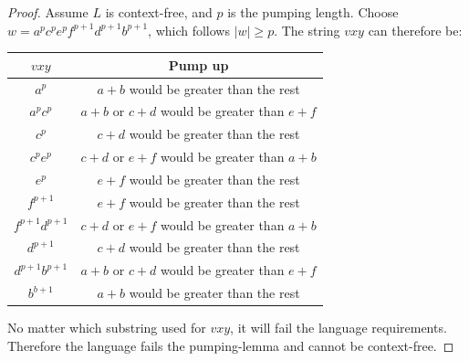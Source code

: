 \documentclass{article}
\begin{document}
\begin{enumerate}
            \begin{proof}
                Assume $L$ is context-free, and $p$ is the pumping length. Choose $w = a^pc^pe^pf^{p+1}d^{p+1}b^{p+1}$, which follows $|w| \geq p$. The string $vxy$ can therefore be:\\
                \begin{tabular}{|c|c|}
                    \hline
                    $vxy$ & Pump up \\
                    \hline
                    $a^p$ & $a+b$ would be greater than the rest \\
                    \hline
                    $a^pc^p$ & $a+b$ or $c+d$ would be greater than $e+f$\\
                    \hline
                    $c^p$ & $c+d$ would be greater than the rest \\
                    \hline
                    $c^pe^p$ & $c+d$ or $e+f$ would be greater than $a+b$\\
                    \hline 
                    $e^p$ & $e+f$ would be greater than the rest\\
                    \hline
                    $f^{p+1}$ & $e+f$ would be greater than the rest\\
                    \hline
                    $f^{p+1}d^{p+1}$ & $c+d$ or $e+f$ would be greater than $a+b$\\
                    \hline
                    $d^{p+1}$ & $c+d$ would be greater than the rest \\
                    \hline 
                    $d^{p+1}b^{p+1}$ & $a+b$ or $c+d$ would be greater than $e+f$\\
                    \hline
                    $b^{b+1}$ & $a+b$ would be greater than the rest \\
                    \hline
                \end{tabular}
                
                No matter which substring used for $vxy$, it will fail the language requirements. Therefore the language fails the pumping-lemma and cannot be context-free.
            \end{proof}
    \end{enumerate}
\end{document}
